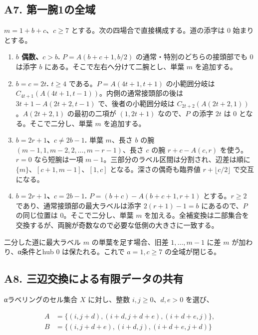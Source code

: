 \documentclass[
  10pt,
  a4paper,
]{article}
\providecommand{\tightlist}{%
  \setlength{\itemsep}{0pt}\setlength{\parskip}{0pt}}
\begin{document}
\subsection{A7.
第一腕1の全域}\label{a7.-ux7b2cux4e00ux81551ux306eux5168ux57df}

\(m=1+b+c\)、\(c\ge7\) とする。次の四場合で直接構成する。道の添字は
\(0\) 始まりとする。

\begin{enumerate}
\def\labelenumi{\arabic{enumi}.}
\tightlist
\item
  \textbf{\(b\) 偶数、\(c>b\).} \(P=A(b+c+1,b/2)\)
  の通常・特別のどちらの接頭部でも \(0\) は添字 \(b\)
  にある。そこで左右へ分けて二腕とし、単葉 \(m\) を追加する。
\item
  \textbf{\(b=c=2t\).} \(t\ge4\) である。\(P=A(4t+1,t+1)\)
  の小範囲分岐は \(C_{4t+1}(A(4t+1,t-1))\)。内側の通常接頭部の後は
  \(3t+1-A(2t+2,t-1)\) で、後者の小範囲分岐は
  \(C_{2t+2}(A(2t+2,1))\)。\(A(2t+2,1)\) の最初の二項が \((1,2t+1)\)
  なので、\(P\) の添字 \(2t\) は \(0\) となる。そこで二分し、単葉 \(m\)
  を追加する。
\item
  \textbf{\(b=2r+1\)、\(c\ne2b-1\).} 単葉 \(m\)、長さ \(b\) の腕
  \((m-1,1,m-2,2,\ldots,m-r-1)\)、長さ \(c\) の腕 \(r+c-A(c,r)\)
  を使う。\(r=0\) なら短腕は一項
  \(m-1\)。三部分のラベル区間は分割され、辺差は順に
  \(\{m\}\)、\([c+1,m-1]\)、\([1,c]\) となる。深さの偶奇も臨界値
  \(r+\lfloor c/2\rfloor\) で交互になる。
\item
  \textbf{\(b=2r+1\)、\(c=2b-1\).} \(P=(b+c)-A(b+c+1,r+1)\)
  とする。\(r\ge2\) であり、通常接頭部の最大ラベルは添字 \(2(r+1)-1=b\)
  にあるので、\(P\) の同じ位置は \(0\)。そこで二分し、単葉 \(m\)
  を加える。全補変換は二部集合を交換するが、両腕が奇数なので必要な低側の大きさに一致する。
\end{enumerate}

二分した道に最大ラベル \(m\) の単葉を足す場合、旧差 \(1,\ldots,m-1\)
に差 \(m\) が加わり、α条件とhub \(0\) は保たれる。これで \(a=1,c\ge7\)
の全域が閉じる。

\subsection{A8.
三辺交換による有限データの共有}\label{a8.-ux4e09ux8fbaux4ea4ux63dbux306bux3088ux308bux6709ux9650ux30c7ux30fcux30bfux306eux5171ux6709}

αラベリングのセル集合 \(X\) に対し、整数 \(i,j\ge0\)、\(d,e>0\) を選び、

\[
\begin{aligned}
A&=\{(i,j+d),(i+d,j+d+e),(i+d+e,j)\},\\
B&=\{(i,j+d+e),(i+d,j),(i+d+e,j+d)\}
\end{aligned}
\]
\end{document}
